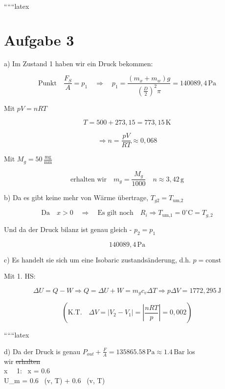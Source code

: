 
``````latex


\section*{Aufgabe 3}

a) Im Zustand 1 haben wir ein Druck bekommen:

\[
\text{Punkt} \quad \frac{F_S}{A} = p_1 \quad \Rightarrow \quad p_1 = \frac{(m_x + m_w)g}{\left(\frac{D}{2}\right)^2 \pi} = \boxed{140089,4 \, \text{Pa}}
\]

Mit \quad \( pV = nRT \)

\[
T = 500 + 273,15 = 773,15 \, \text{K}
\]

\[
\Rightarrow n = \frac{pV}{RT} \approx 0,068
\]

Mit \quad \( M_g = 50 \, \frac{\text{mg}}{\text{mm}} \)

\[
\text{erhalten wir} \quad m_g = \frac{M_g}{1000} \quad n \approx 3,42 \, \text{g}
\]

b) Da es gibt keine mehr von Wärme übertrage, \( T_{g2} = T_{\text{um,2}} \)

\[
\text{Da} \quad x > 0 \quad \Rightarrow \quad \text{Es gilt noch} \quad R_i \Rightarrow \boxed{T_{\text{um,1}} = 0^\circ \text{C} = T_{g,2}}
\]

Und da der Druck bilanz ist genau gleich - \( p_2 = p_1 \)

\[
\boxed{140089,4 \, \text{Pa}}
\]

c) Es handelt sie sich um eine Isobaric zustandsänderung, d.h. \( p = \text{const} \)

Mit 1. HS:

\[
\Delta U = Q - W \Rightarrow Q = \Delta U + W = m_g c_v \Delta T \Rightarrow p \Delta V = 1772,295 \, \text{J}
\]

\[
\left( \text{K.T.} \quad \Delta V = |V_2 - V_1| = \left| \frac{nRT}{p} \right| = 0,002 \right)
\]

``````latex


d) Da der Druck is genau \( P_{out} + \frac{F}{A} = 135865.58 \, \text{Pa} \approx 1.4 \, \text{Bar} \) los \\
wir \st{erhalten} \,  \,  \,  \,  \,  \\

\Rightarrow x \cdot {} \,  \, 1: \, x = 0.6 \\

\Rightarrow U_m = 0.6 \cdot {} \, (v, T) + 0.6 \cdot {} \, (v, T)  \,  \Rightarrow \\

